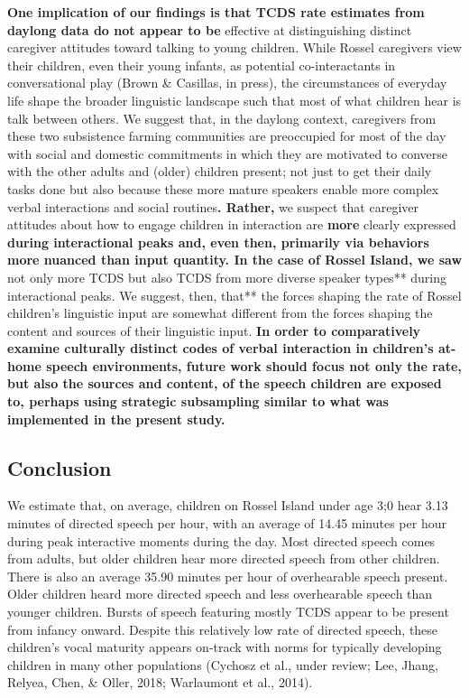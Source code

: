 \documentclass[,man,floatsintext]{apa6}
\begin{document}
\textbf{One implication of our findings is that TCDS rate estimates from
daylong data do not appear to be} effective at distinguishing distinct
caregiver attitudes toward talking to young children. While Rossel
caregivers view their children, even their young infants, as potential
co-interactants in conversational play (Brown \& Casillas, in press),
the circumstances of everyday life shape the broader linguistic
landscape such that most of what children hear is talk between others.
We suggest that, in the daylong context, caregivers from these two
subsistence farming communities are preoccupied for most of the day with
social and domestic commitments in which they are motivated to converse
with the other adults and (older) children present; not just to get
their daily tasks done but also because these more mature speakers
enable more complex verbal interactions and social routines\textbf{.
Rather,} we suspect that caregiver attitudes about how to engage
children in interaction are \textbf{more} clearly expressed
\textbf{during interactional peaks and, even then, primarily via
behaviors more nuanced than input quantity. In the case of Rossel
Island, we saw }not only more TCDS but also TCDS from more diverse
speaker types** during interactional peaks. We suggest, then, that** the
forces shaping the rate of Rossel children's linguistic input are
somewhat different from the forces shaping the content and sources of
their linguistic input. \textbf{In order to comparatively examine
culturally distinct codes of verbal interaction in children's at-home
speech environments, future work should focus not only the rate, but
also the sources and content, of the speech children are exposed to,
perhaps using strategic subsampling similar to what was implemented in
the present study.}

\subsection{Conclusion}\label{disc-conclusion}

We estimate that, on average, children on Rossel Island under age 3;0
hear 3.13 minutes of directed speech per hour, with an average of 14.45
minutes per hour during peak interactive moments during the day. Most
directed speech comes from adults, but older children hear more directed
speech from other children. There is also an average 35.90 minutes per
hour of overhearable speech present. Older children heard more directed
speech and less overhearable speech than younger children. Bursts of
speech featuring mostly TCDS appear to be present from infancy onward.
Despite this relatively low rate of directed speech, these children's
vocal maturity appears on-track with norms for typically developing
children in many other populations (Cychosz et al., under review; Lee,
Jhang, Relyea, Chen, \& Oller, 2018; Warlaumont et al., 2014).
\end{document}
